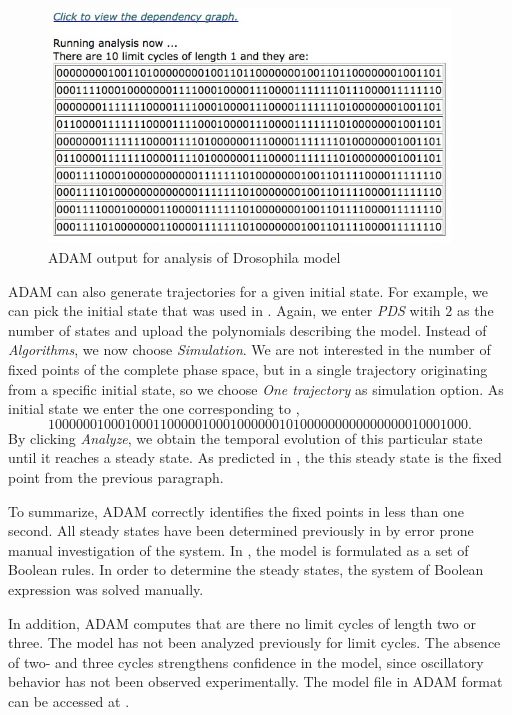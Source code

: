 \documentclass[11pt]{amsart}
\begin{document}
\begin{figure}[htb]
  \centering
  \includegraphics[width=0.95\textwidth]{DroAlgOutput.jpg}
  \caption{ADAM output for analysis of Drosophila model}
  \label{fig:alg}
\end{figure}

ADAM can also generate trajectories for a given initial state. For example, we can pick the initial state that was used in \cite[Figure 4(a)]{AO}. Again, we enter {\it PDS} witih $2$ as the number of states and upload the polynomials describing the model. Instead of {\it Algorithms}, we now choose {\it Simulation}. We are not interested in the number of fixed points of the complete phase space, but in a single trajectory originating from a specific initial state, so we choose {\it One trajectory} as simulation option. As initial state we enter the one corresponding to \cite[Figure 4(a)]{AO}, $$100000010001000110000010001000000101000000000000000010001000.$$ 
By clicking {\it Analyze}, we obtain the temporal evolution of this particular state until it reaches a steady state. As predicted in \cite{AO}, the this steady state is the fixed point from the previous paragraph. 


To summarize, ADAM correctly identifies the fixed points
in less than one second. All steady states have been determined previously in \cite{AO} by error prone manual investigation of the system. In \cite{AO}, the model is formulated as a set of Boolean rules. In order to determine the steady states, the system of Boolean expression was solved manually.

 In addition, ADAM computes that are there no limit
cycles of length two or three. The model has not been analyzed previously for
limit cycles. The absence of two- and three cycles strengthens confidence in
the model, since oscillatory behavior has not been observed experimentally.
The model file in ADAM format can be accessed at \cite{DrosophilaModel}. 
\end{document}
